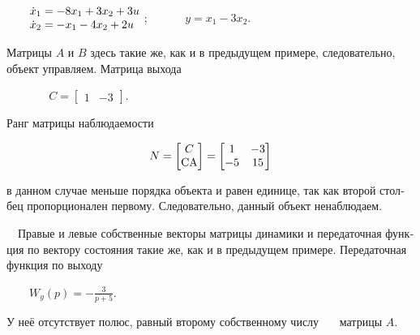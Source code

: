 \documentclass[a4paper]{article}
\newcommand\normalsubformula[1]{\text{\mathversion{normal}$#1$}}
\begin{document}
{\begin{russian}\sffamily
\ \ \ \  $\begin{matrix}\dot x_1=-8x_1+3x_2+3u\hfill\null \\\dot x_2=-x_1-4x_2+2u\hfill\null \end{matrix}\hfill $ ;
\ \ \ \ \ \  $y=x_1-3x_2$.\ \ 
\end{russian}}

{\begin{russian}\sffamily
Матрицы  $A$ и  $B$ здесь такие же, как и в предыдущем примере, следовательно, объект управляем. Матрица выхода
\end{russian}}

{\begin{russian}\sffamily
\ \ \textenglish{\ \ } $\;\;\;\;\;C=\left[\begin{matrix}1&-3\end{matrix}\right]$.
\end{russian}}

{\begin{russian}\sffamily
Ранг матрицы наблюдаемости
\end{russian}}

\begin{equation*}
N=\left[\begin{matrix}C\\\normalsubformula{\text{CA}}\end{matrix}\right]=\left[\begin{matrix}1&-3\\-5&15\end{matrix}\right]
\end{equation*}
{\begin{russian}\sffamily
в данном случае меньше порядка объекта и равен единице, так как второй столбец пропорционален первому. Следовательно,
данный объект ненаблюдаем.
\end{russian}}

{\begin{russian}\sffamily
\ \ Правые и левые собственные векторы матрицы динамики и передаточная функция по вектору состояния такие же, как и в
предыдущем примере. Передаточная функция по выходу
\end{russian}}

{\begin{russian}\sffamily
\ \ \ \  $W_y(p)=-\frac 3{p+5}$.
\end{russian}}

{\begin{russian}\sffamily
У неё отсутствует полюс, равный второму собственному числу \ \ \ матрицы  $A$.
\end{russian}}
\end{document}

